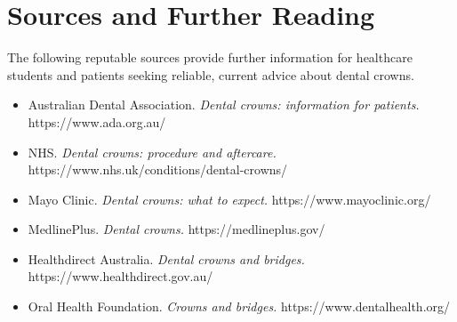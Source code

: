 \section*{Sources and Further Reading}
The following reputable sources provide further information for healthcare students and patients seeking reliable, current advice about dental crowns.

\begin{itemize}
    \item Australian Dental Association. \textit{Dental crowns: information for patients.} https://www.ada.org.au/
    \item NHS. \textit{Dental crowns: procedure and aftercare.} https://www.nhs.uk/conditions/dental-crowns/
    \item Mayo Clinic. \textit{Dental crowns: what to expect.} https://www.mayoclinic.org/
    \item MedlinePlus. \textit{Dental crowns.} https://medlineplus.gov/
    \item Healthdirect Australia. \textit{Dental crowns and bridges.} https://www.healthdirect.gov.au/
    \item Oral Health Foundation. \textit{Crowns and bridges.} https://www.dentalhealth.org/
\end{itemize}
